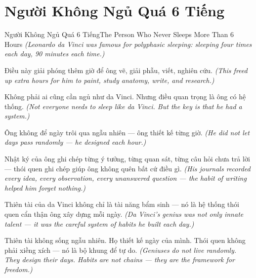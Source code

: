\section{Người Không Ngủ Quá 6 Tiếng}
\begin{truyen}{Người Không Ngủ Quá 6 Tiếng}{The Person Who Never Sleeps More Than 6 Hours}
\textit{(Leonardo da Vinci was famous for polyphasic sleeping: sleeping four times each day, 90 minutes each time.)}

Điều này giải phóng thêm giờ để ông vẽ, giải phẫu, viết, nghiên cứu.
\textit{(This freed up extra hours for him to paint, study anatomy, write, and research.)}

Không phải ai cũng cần ngủ như da Vinci. Nhưng điều quan trọng là ông có hệ thống.
\textit{(Not everyone needs to sleep like da Vinci. But the key is that he had a system.)}

Ông không để ngày trôi qua ngẫu nhiên — ông thiết kế từng giờ.
\textit{(He did not let days pass randomly — he designed each hour.)}

Nhật ký của ông ghi chép từng ý tưởng, từng quan sát, từng câu hỏi chưa trả lời — thói quen ghi chép giúp ông không quên bất cứ điều gì.
\textit{(His journals recorded every idea, every observation, every unanswered question — the habit of writing helped him forget nothing.)}

Thiên tài của da Vinci không chỉ là tài năng bẩm sinh — nó là hệ thống thói quen cẩn thận ông xây dựng mỗi ngày.
\textit{(Da Vinci's genius was not only innate talent — it was the careful system of habits he built each day.)}

\end{truyen}

\begin{baihoc}
Thiên tài không sống ngẫu nhiên. Họ thiết kế ngày của mình. Thói quen không phải xiềng xích — nó là bộ khung để tự do.
\textit{(Geniuses do not live randomly. They design their days. Habits are not chains — they are the framework for freedom.)}
\end{baihoc}
\ngancach


